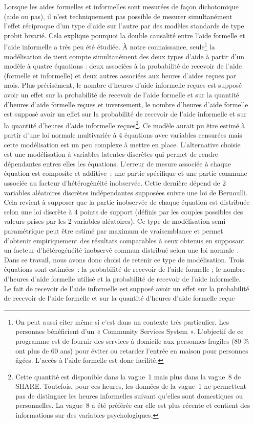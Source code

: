 \begin{Article}
\begin{refsection}[Bonnal]
Lorsque les aides formelles et informelles sont mesurées de façon dichotomique (aide ou pas), il n’est techniquement pas possible de mesurer simultanément l’effet réciproque d'un type d'aide sur l'autre par des modèles standards de type probit bivarié. Cela explique pourquoi la double causalité entre l'aide formelle et l'aide informelle a très peu été étudiée. À notre connaissance, seule\footnote{On peut aussi citer \textcite{Greene1983} même si c'est dans un contexte très particulier. Les personnes bénéficient d’un « Community Services System ». L’objectif de ce programme est de fournir des services à domicile aux personnes fragiles (80 \% ont plus de 60 ans) pour éviter ou retarder l’entrée en maison pour personnes âgées. L’accès à l’aide formelle est donc facilité.} la modélisation de \textcite{BALIA2014} tient compte simultanément des deux types d'aide à partir d'un modèle à quatre équations : deux associées à la probabilité de recevoir de l'aide (formelle et informelle) et deux autres associées aux heures d'aides reçues par mois. Plus précisément, le nombre d'heures d'aide informelle reçues est supposé avoir un effet sur la probabilité de recevoir de l'aide formelle et sur la quantité d'heures d'aide formelle reçues et inversement, le nombre d'heures d'aide formelle est supposé avoir un effet sur la probabilité de recevoir de l'aide informelle et sur la quantité d'heures d'aide informelle reçues\footnote{Cette quantité est disponible dans la vague~1 mais plus dans la vague~8 de SHARE. Toutefois, pour ces heures, les données de la vague~1 ne permettent pas de distinguer les heures informelles suivant qu'elles sont domestiques ou personnelles. La vague~8 a été préférée car elle est plus récente et contient des informations sur des variables psychologiques.}. Ce modèle aurait pu être estimé à partir d’une loi normale multivariée à 4 équations avec variables censurées mais cette modélisation est un peu complexe à mettre en place. L’alternative choisie est une modélisation à variables latentes discrètes qui permet de rendre dépendantes entres elles les équations. L’erreur de mesure associée à chaque équation est composite et additive~: une partie spécifique et une partie commune associée au facteur d’hétérogénéité inobservée. Cette dernière dépend de 2 variables aléatoires discrètes indépendantes supposées suivre une loi de Bernoulli. Cela revient à supposer que la partie inobservée de chaque équation est distribuée selon une loi discrète à 4 points de support (définis par les couples possibles des valeurs prises par les 2 variables aléatoires). Ce type de modélisation semi-paramétrique peut être estimé par maximum de vraisemblance et permet d’obtenir empiriquement des résultats comparables à ceux obtenus en supposant un facteur d’hétérogénéité inobservé commun distribué selon une loi normale \parencite{bonnal1997}. Dans ce travail, nous avons donc choisi de retenir ce type de modélisation. Trois équations sont estimées~: la probabilité de recevoir de l'aide formelle ; le nombre d'heures d'aide formelle utilisé et la probabilité de recevoir de l'aide informelle. Le fait de recevoir de l'aide informelle est supposé avoir un effet sur la probabilité de recevoir de l'aide formelle et sur la quantité d'heures d'aide formelle reçue 
\end{refsection}
\end{Article}
